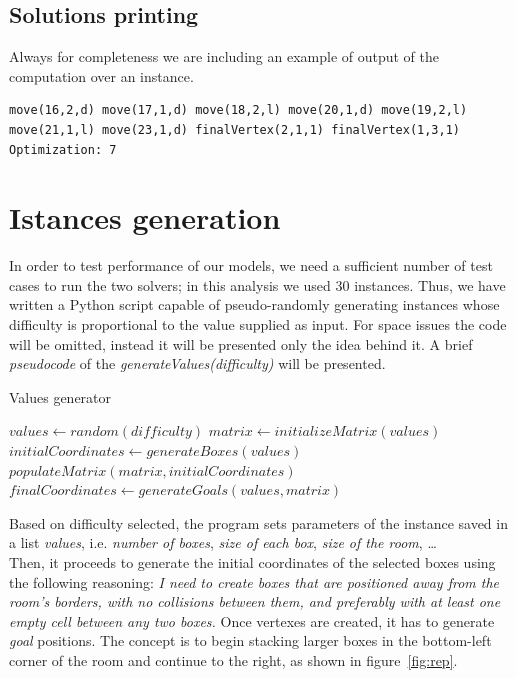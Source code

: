 \documentclass[headinclude, footinclude, abstract=on]{scrarticle}
\begin{document}
\subsection{Solutions printing}
Always for completeness we are including an example of output of the computation over an instance.
\begin{verbatim}
move(16,2,d) move(17,1,d) move(18,2,l) move(20,1,d) move(19,2,l) 
move(21,1,l) move(23,1,d) finalVertex(2,1,1) finalVertex(1,3,1)
Optimization: 7
\end{verbatim}

\section{Istances generation}
In order to test performance of our models, we need a sufficient number of test cases to run the two solvers; in this analysis we used 30 instances. Thus, we have written a Python script capable of pseudo-randomly generating instances whose difficulty is proportional to the value supplied as input. For space issues the code will be omitted, instead it will be presented only the idea behind it. A brief \textit{pseudocode} of the \textit{generateValues(difficulty)} will be presented.

\begin{algorithm}
\caption{Values generator}\label{alg:instance}
\begin{algorithmic}
\State $values \gets random(difficulty)$
\State $matrix \gets initializeMatrix(values)$
\State $initialCoordinates \gets generateBoxes(values)$
\State $populateMatrix(matrix,initialCoordinates)$
\State $finalCoordinates \gets generateGoals(values,matrix)$
\end{algorithmic}
\end{algorithm}
Based on difficulty selected, the program sets parameters of the instance saved in a list \textit{values}, i.e. \textit{number of boxes}, \textit{size of each box}, \textit{size of the room}, \ldots \\Then, it proceeds to generate the initial coordinates of the selected boxes using the following reasoning: \textit{I need to create boxes that are positioned away from the room's borders, with no collisions between them, and preferably with at least one empty cell between any two boxes.} Once vertexes are created, it has to generate \textit{goal} positions. The concept is to begin stacking larger boxes in the bottom-left corner of the room and continue to the right, as shown in figure~\ref{fig:rep}.
\end{document}
